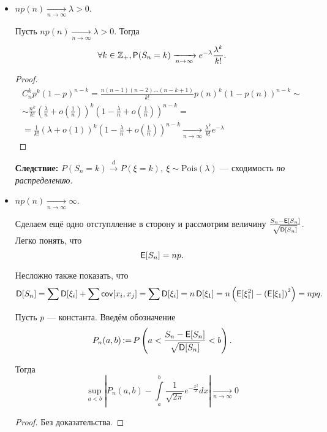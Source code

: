\begin{itemize}
    \item
        $np(n) \xrightarrow[n\to\infty]{} \lambda > 0$. 

        \begin{theorem}[Пуассон]

            Пусть $np(n) \xrightarrow[n\to\infty]{} \lambda > 0$. 
            Тогда 
                \[
                    \forall k \in \mathbb{Z}_+, \operatorname{\mathsf{P}}(S_n = k) \xrightarrow[n\to\infty]{} e^{-\lambda}\frac{\lambda^k}{k!}.
                \]
        \end{theorem}
        \begin{proof}
            \begin{multline*}
                C_n^kp^k(1-p)^{n-k} =
                \frac{n(n-1)(n-2)\ldots(n-k+1)}{k!}p(n)^k(1-p(n))^{n-k} \sim\\\sim
                \frac{n^k}{k!}\left(\frac{\lambda}{n}+o\left(\frac{1}{n}\right)\right)^k\left( 1-\frac{\lambda}{n}+o\left( \frac{1}{n} \right) \right)^{n-k} =\\=
                \frac{1}{k!}\left(\lambda+o\left(1\right)\right)^k\left( 1-\frac{\lambda}{n}+o\left( \frac{1}{n} \right) \right)^{n-k} \xrightarrow[n\to\infty]{}
                \frac{\lambda^k}{k!}e^{-\lambda}
            \end{multline*}
        \end{proof}
        \textbf{Следствие:} $P(S_n = k) \overset{d}{\to} P(\xi = k),\ \xi \sim \mathrm{Pois}(\lambda)$ --- сходимость \emph{по распределению}.

    \item
        $np(n) \xrightarrow[n\to\infty]{} \infty$. 

        Сделаем ещё одно отступлление в сторону и рассмотрим величину $\frac{S_n - \operatorname{\mathsf{E}}[S_n]}{\sqrt{\operatorname{\mathsf{D}}[S_n]}}$.
        Легко понять, что 
        \[
            \operatorname{\mathsf{E}}[S_n] = np.
        \]
        
        Несложно также показать, что 
        \[
            \operatorname{\mathsf{D}}[S_n] = \sum\operatorname{\mathsf{D}}[\xi_i] + \sum\operatorname{\mathsf{cov}}[x_i, x_j] = \sum\operatorname{\mathsf{D}}[\xi_i] = n\operatorname{\mathsf{D}}[\xi_1] = n\left( \operatorname{\mathsf{E}}[\xi_1^2]-\left( \operatorname{\mathsf{E}}[\xi_1] \right)^2 \right) = npq.
        \]

        \begin{theorem}
            Пусть $p$ --- константа. Введём обозначение
            \[
                P_n(a,b)\mathop{:=} P\left( a < \frac{S_n - \operatorname{\mathsf{E}}[S_n]}{\sqrt{\operatorname{\mathsf{D}}[S_n]}} < b \right).
            \]

            Тогда 
            \[
                \sup_{a<b} \left|P_n(a, b) - \int\limits_a^b\frac{1}{\sqrt{2\pi}}e^{-\frac{x^{2}}{2}}dx\right| \xrightarrow[n\to\infty]{} 0
            \]
        \end{theorem}
        \begin{proof}
            Без доказательства.
        \end{proof}
\end{itemize}

